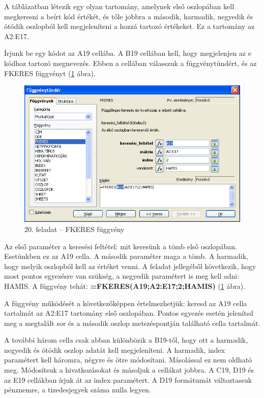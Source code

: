 A táblázatban létezik egy olyan tartomány, amelynek első
oszlopában kell megkeresni a beírt kód értékét, és
tőle jobbra a második, harmadik, negyedik és ötödik
oszlopból kell megjeleníteni a hozzá tartozó értékeket. Ez
a tartomány az A2:E17.

Írjunk be egy kódot az A19 cellába. A B19 cellában kell, hogy
megjelenjen az e kódhoz tartozó megnevezés. Ebben a cellában
válasszuk a függvénytündért, és az FKERES függvényt
(\ref{20-feladatVLOOKUP} ábra).

\begin{figure}[!h]
\begin{center}
\includegraphics[width=15.999cm]{oocalcv2-img95.png}
\caption{20. feladat -- FKERES függvény}\label{20-feladatVLOOKUP}
\end{center}
\end{figure}

Az első paraméter a keresési feltétel: mit keresünk a tömb
első oszlopában. Esetünkben ez az A19 cella. A második
paraméter maga a tömb. A harmadik, hogy melyik oszlopból kell az
értéket venni. A feladat jellegéből következik, hogy most
pontos egyezésre van szükség, a negyedik paramétert is meg kell
adni: HAMIS. A függvény tehát:
\textsf{\textbf{=FKERES(A19;A2:E17;2;HAMIS)}} (\ref{20-feladatVLOOKUP}
ábra).

A függvény működését a következőképpen
értelmezhetjük: keresd az A19 cella tartalmát az A2:E17
tartomány első oszlopában. Pontos egyezés esetén
jelenítsd meg a megtalált sor és a második oszlop
metszéspontján található cella tartalmát.

A további három cella csak abban különbözik a B19-től,
hogy ott a harmadik, negyedik és ötödik oszlop adatát kell
megjeleníteni. A harmadik, index paramétert kell háromra,
négyre és ötre módosítani. Másolással ez nem oldható
meg. Módosítsuk a hivatkozásokat és másoljuk a cellákat
jobbra. A C19, D19 és az E19 cellákban írjuk át az index
paramétert. A D19 formátumát változtassuk pénznemre, a
tizedesjegyek száma nulla legyen.

